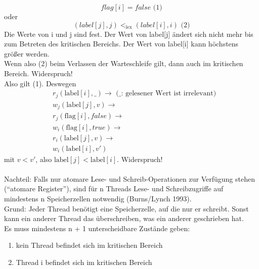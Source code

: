 \begin{equation*}
	flag[i] = false \text{ (1)}
\end{equation*}
oder
\begin{equation*}
	\left(label[j], j\right) <_\text{lex} \left(label[i], i\right) \text{ (2)}
\end{equation*}
Die Werte von i und j sind fest. Der Wert von label[j] ändert sich nicht mehr bis zum Betreten des kritischen Bereichs. Der Wert von label[i] kann höchstens größer werden.\\
Wenn also (2) beim Verlassen der Warteschleife gilt, dann auch im kritischen Bereich. Widerspruch!\\
Also gilt (1). Deswegen 
\begin{align*}
&	r_j\left(\text{label}[i], \_\right) \rightarrow \text{ (\_: gelesener Wert ist irrelevant)}\\
&	w_j\left(\text{label}[j], v\right) \rightarrow\\
&	r_j\left(\text{flag}[i], false\right) \rightarrow\\
&	w_i\left(\text{flag}[i], true\right) \rightarrow\\
&	r_i\left(\text{label}[j], v\right) \rightarrow\\
&	w_i\left(\text{label}[i], v'\right)
\end{align*}
mit $v < v'$, also $\text{label}[j] < \text{label}[i]$. Widerspruch!\\
\\
Nachteil: Falls nur atomare Lese- und Schreib-Operationen zur Verfügung stehen ("`atomare Register"'), sind für n Threads Lese- und Schreibzugriffe auf mindestens n Speicherzellen notwendig (Burns/Lynch 1993).\\
Grund: Jeder Thread benötigt eine Speicherzelle, auf die nur er schreibt. Sonst kann ein anderer Thread das überschreiben, was ein anderer geschrieben hat.\\
Es muss mindestens n + 1 unterscheidbare Zustände geben: 
\begin{enumerate}
	\item kein Thread befindet sich im kritischen Bereich
	\item Thread i befindet sich im kritischen Bereich
\end{enumerate}